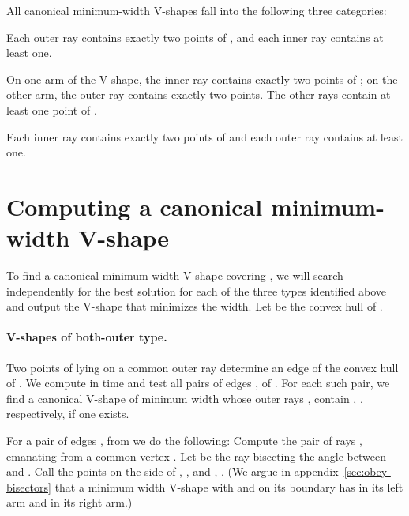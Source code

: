 \documentclass{llncs}
\begin{document}
All canonical minimum-width V-shapes fall into the following three
categories: \begin{description}\itemsep 0pt \parsep 0pt \parskip 0pt
\item[both-outer] Each outer ray contains exactly two points of , and each
  inner ray contains at least one. 
\item[inner-outer] On one arm of the V-shape, the inner ray contains exactly two points of ; on the other
  arm, the outer ray contains exactly two points. The other rays contain at least one point of .
\item[both-inner] Each inner ray contains exactly two points of  and each outer 
  ray contains at least one.
\end{description}

\section{Computing a canonical minimum-width V-shape}
\label{sec:algorithm}

To find a canonical minimum-width V-shape covering , we will search
independently for the best solution for each of the three types identified
above and output the V-shape that minimizes the width.  Let  be the
convex hull of .

\paragraph*{V-shapes of both-outer type.}




\iffalse
Two points of  lying on a common outer ray determine an edge of the
convex hull  of .  We compute  in 
time \cite{ComputationalGeometry} and test all pairs of edges ,
 of .  For each such pair, we find a canonical V-shape of
minimum width whose outer rays ,  contain , ,
respectively, if one exists.

For a pair of edges ,  from  we do the following:
Compute the pair of rays , 
emanating from a common vertex .  Let  be the ray bisecting the
angle between  and .  
Call the points on the  side of , , and , .
(We argue in appendix~\ref{sec:obey-bisectors} that a minimum width V-shape 
with  and  on its boundary has  in its left arm and  in its right arm.)
\end{document}
